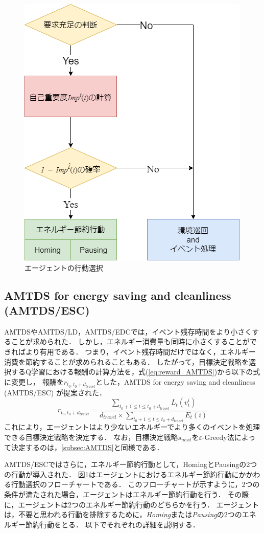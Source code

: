 \documentclass[12pt,a4j,twoside]{jarticle}
\begin{document}
  \begin{figure}
    \centering
    \includegraphics[width=0.6\hsize]{figures/Flowchart.png}
    \caption{エージェントの行動選択}
    \label{fig:flowchart}
  \end{figure}


  \subsection{AMTDS for energy saving and cleanliness (AMTDS/ESC)}
  AMTDSやAMTDS/LD，AMTDS/EDCでは，イベント残存時間をより小さくすることが求められた．
  しかし，エネルギー消費量も同時に小さくすることができればより有用である．
  つまり，イベント残存時間だけではなく，エネルギー消費を節約することが求められることもある．
  したがって，目標決定戦略を選択するQ学習における報酬の計算方法を，式(\ref{eq:reward_AMTDS})から以下の式に変更し，
  報酬を$r_{t_0,t_0+d_{travel}}$とした，AMTDS for energy saving and cleanliness (AMTDS/ESC) \cite{Wu2019}が提案された．
  \begin{equation}
    r_{t_0,t_0+d_{travel}} = \dfrac{\displaystyle\sum_{t_0+1 \leq t \leq t_0+d_{travel}} L_t(v^i_t)}{d_{travel} \times \displaystyle\sum_{t_0+1 \leq t \leq t_0+d_{travel}} E_t(i)}
  \end{equation}
  これにより，エージェントはより少ないエネルギーでより多くのイベントを処理できる目標決定戦略を決定する．
  なお，目標決定戦略$s_{next}$を$\varepsilon$-Greedy法によって決定するのは，\ref{subsec:AMTDS}と同様である． 
  \par

  AMTDS/ESCではさらに，エネルギー節約行動として，HomingとPausingの2つの行動が導入された．
  図\ref{fig:flowchart}はエージェントにおけるエネルギー節約行動にかかわる行動選択のフローチャートである．
  このフローチャートが示すように，2つの条件が満たされた場合，エージェントはエネルギー節約行動を行う．
  その際に，エージェントは2つのエネルギー節約行動のどちらかを行う．
  エージェントは，不要と思われる行動を排除するために，{\em Homing}または{\em Pausing}の2つのエネルギー節約行動をとる．
  以下でそれぞれの詳細を説明する．
\end{document}
